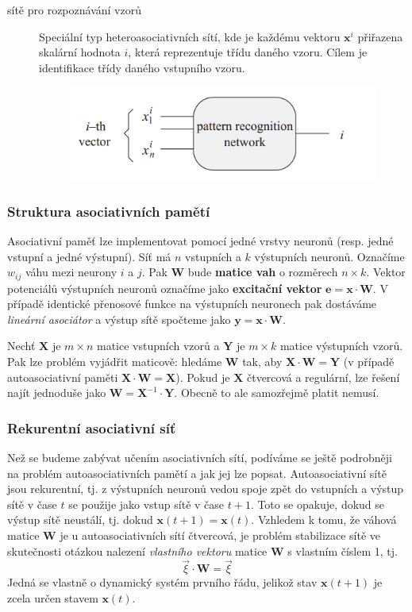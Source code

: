 \documentclass[11pt]{report} %
\renewcommand{\vec}[1]{\mathbf{#1}}
\numberwithin{equation}{section}
\begin{document}
\begin{description}
	\item[sítě pro rozpoznávání vzorů] Speciální typ heteroasociativních sítí, kde je každému vektoru $\vec{x}^i$ přiřazena skalární hodnota $i$, která reprezentuje třídu daného vzoru. Cílem je identifikace třídy daného vstupního vzoru.
	\begin{figure}[H]
		\centering
		\includegraphics[scale=1]{img/nn_asoc_class}
	\end{figure}
	
\end{description}

\subsubsection{Struktura asociativních pamětí}
Asociativní paměť lze implementovat pomocí jedné vrstvy neuronů (resp. jedné vstupní a jedné výstupní). Síť má $n$ vstupních a $k$ výstupních neuronů. Označíme $w_{ij}$ váhu mezi neurony $i$ a $j$. Pak $\vec{W}$ bude \textbf{matice vah} o rozměrech $n \times k$. Vektor potenciálů výstupních neuronů označíme jako \textbf{excitační vektor} $\vec{e} = \vec{x}\cdot \vec{W}$. V případě identické přenosové funkce na výstupních neuronech pak dostáváme \textit{lineární asociátor} a výstup sítě spočteme jako $\vec{y} = \vec{x} \cdot \vec{W}$.

Nechť $\vec{X}$ je $m \times n$ matice vstupních vzorů a $\vec{Y}$ je $m \times k$ matice výstupních vzorů. Pak lze problém vyjádřit maticově: hledáme $\vec{W}$ tak, aby $\vec{X}\cdot \vec{W} = \vec{Y}$ (v případě autoasociativní paměti $\vec{X}\cdot \vec{W} = \vec{X}$). Pokud je $\vec{X}$ čtvercová a regulární, lze řešení najít jednoduše jako $\vec{W} = \vec{X}^{-1} \cdot \vec{Y}$. Obecně to ale samozřejmě platit nemusí.

\subsubsection{Rekurentní asociativní síť}
Než se budeme zabývat učením asociativních sítí, podíváme se ještě podrobněji na problém autoasociativních pamětí a jak jej lze popsat. Autoasociativní sítě jsou rekurentní, tj. z výstupních neuronů vedou spoje zpět do vstupních a výstup sítě v čase $t$ se použije jako vstup sítě v čase $t+1$. Toto se opakuje, dokud se výstup sítě neustálí, tj. dokud $\vec{x}(t+1) = \vec{x}(t)$. Vzhledem k tomu, že váhová matice $\vec{W}$ je u autoasociativních sítí čtvercová, je problém stabilizace sítě ve skutečnosti otázkou nalezení \textit{vlastního vektoru} matice $\vec{W}$ s vlastním číslem 1, tj. 
$$\overrightarrow{\xi} \cdot \vec{W} = \overrightarrow{\xi}$$
Jedná se vlastně o dynamický systém prvního řádu, jelikož stav $\vec{x}(t+1)$ je zcela určen stavem $\vec{x}(t)$.
\end{document}
